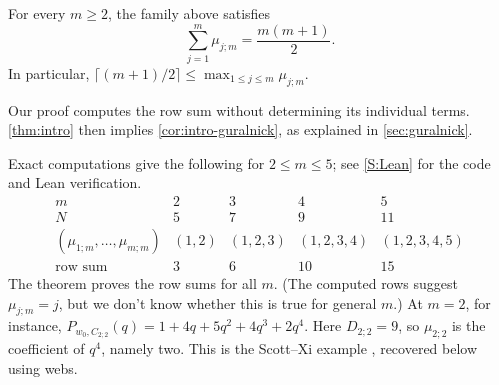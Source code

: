 \documentclass[a4paper,11pt]{amsart}
\numberwithin{equation}{subsection}
\theoremstyle{plain}
\theoremstyle{definition}
\theoremstyle{remark}
\begin{document}
\begin{theorem}\label{thm:intro}
For every $m\ge2$, the family above satisfies
\[
\sum_{j=1}^{m}\mu_{j;m}=\frac{m(m+1)}{2}.
\]
In particular, $\lceil(m+1)/2\rceil\leq\max_{1\le j\le m}\mu_{j;m}$.
\end{theorem}

Our proof computes the row sum without determining its individual terms. 
\autoref{thm:intro} then implies \autoref{cor:intro-guralnick}, as explained in \autoref{sec:guralnick}.

Exact computations give the following
for $2\le m\le5$; see \autoref{S:Lean} for the code and Lean verification.
\[
\begin{array}{c|cccc}
m&2&3&4&5\\\hline
N&5&7&9&11\\
(\mu_{1;m},\ldots,\mu_{m;m})&(1,2)&(1,2,3)&(1,2,3,4)&(1,2,3,4,5)\\
\text{row sum}&3&6&10&15
\end{array}
\]
The theorem proves the row sums for all $m$.
(The computed rows
suggest $\mu_{j;m}=j$, but we don't know whether this is true for general $m$.) At $m=2$, for instance, $P_{w_0,C_{2;2}}(q)=1+4q+5q^2+4q^3+2q^4$.
Here $D_{2;2}=9$, so $\mu_{2;2}$ is the coefficient of $q^4$,
namely two. This is the Scott--Xi example
\cite[Lemma~3.4]{SX}, recovered below using webs.
\end{document}
